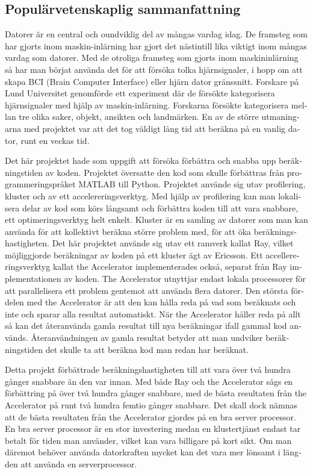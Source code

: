 \documentclass[12pt, a4paper]{article}
\begin{document}
\begin{otherlanguage}{swedish}
\section*{Populärvetenskaplig sammanfattning}
Datorer är en central och oundviklig del av mångas vardag idag.
De framsteg som har gjorts inom maskin-inlärning har gjort det nästintill lika viktigt inom mångas vardag som datorer.
Med de otroliga framsteg som gjorts inom maskininlärning så har man börjat använda det för att försöka tolka hjärnsignaler, i hopp om att skapa BCI (Brain Computer Interface) eller hjärn dator gränssnitt.
Forskare på Lund Universitet genomförde ett experiment där de försökte kategorisera hjärnsignaler med hjälp av maskin-inlärning.
Forskarna försökte kategorisera mellan tre olika saker, objekt, ansikten och landmärken.
En av de större utmaningarna med projektet var att det tog väldigt lång tid att beräkna på en vanlig dator, runt en veckas tid.

Det här projektet hade som uppgift att försöka förbättra och snabba upp beräkningstiden av koden.
Projektet översatte den kod som skulle förbättras från programmeringspråket MATLAB till Python.
Projektet använde sig utav profilering, kluster och av ett accelereringsverktyg.
Med hjälp av profilering kan man lokalisera delar av kod som körs långsamt och förbättra koden till att vara snabbare, ett optimeringsverktyg helt enkelt.
Kluster är en samling av datorer som man kan använda för att kollektivt beräkna större problem med, för att öka beräkningshastigheten.
Det här projektet använde sig utav ett ramverk kallat Ray, vilket möjliggjorde beräkningar av koden på ett kluster ägt av Ericsson.
Ett accellereringsverktyg kallat the Accelerator implementerades också, separat från Ray implementationen av koden.
The Accelerator utnyttjar endast lokala processorer för att parallelisera ett problem gentemot att använda flera datorer.
Den största fördelen med the Accelerator är att den kan hålla reda på vad som beräknats och inte och sparar alla resultat automatiskt.
När the Accelerator håller reda på allt så kan det återanvända gamla resultat till nya beräkningar ifall gammal kod används.
Återanvändningen av gamla resultat betyder att man undviker beräkningstiden det skulle ta att beräkna kod man redan har beräknat.

Detta projekt förbättrade beräkningshastigheten till att vara över två hundra gånger snabbare än den var innan.
Med både Ray och the Accelerator sågs en förbättring på över två hundra gånger snabbare, med de bästa resultaten från the Accelerator på runt två hundra femtio gånger snabbare.
Det skall dock nämnas att de bästa resultaten från the Accelerator gjordes på en bra server processor.
En bra server processor är en stor investering medan en klustertjänst endast tar betalt för tiden man använder, vilket kan vara billigare på kort sikt.
Om man däremot behöver använda datorkraften mycket kan det vara mer lönsamt i längden att använda en serverprocessor.


\end{otherlanguage}
\end{document}

